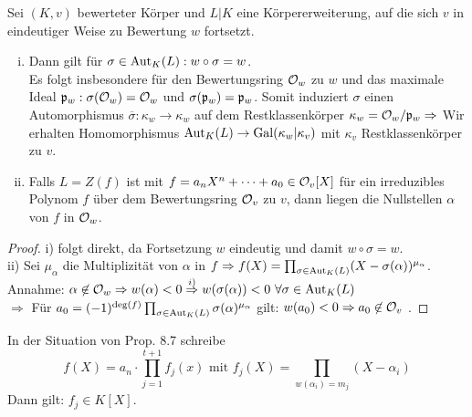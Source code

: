 \begin{Bem}
Sei $(K,v)$ bewerteter Körper und $L|K$ eine Körpererweiterung, auf die sich $v$ in eindeutiger Weise zu Bewertung $w$ fortsetzt.
\begin{enumerate}[i)]
\item Dann gilt für $\sigma \in \operatorname{Aut}_K(L): w \circ \sigma = w$.\\
Es folgt insbesondere für den Bewertungsring $\mathcal{O}_w$ zu $w$ und das maximale Ideal $\mathfrak{p}_w: \sigma(\mathcal{O}_w)=\mathcal{O}_w$ und $\sigma(\mathfrak{p}_w)=\mathfrak{p}_w$. Somit induziert $\sigma$ einen Automorphismus $\overline{\sigma}: \kappa_w \to \kappa_w$ auf dem Restklassenkörper $\kappa_w=\mathcal{O}_w/\mathfrak{p}_w \Rightarrow$ Wir erhalten Homomorphismus $\operatorname{Aut}_K(L) \to \operatorname{Gal}(\kappa_w|\kappa_v)$ mit $\kappa_v$ Restklassenkörper zu $v$.
\item Falls $L=Z(f)$ ist mit $f=a_nX^n+\dots+a_0 \in \mathcal{O}_v[X]$ für ein irreduzibles Polynom $f$ über dem Bewertungsring $\mathcal{O}_v$ zu $v$, dann liegen die Nullstellen $\alpha$ von $f$ in $\mathcal{O}_w$.
\end{enumerate}
\end{Bem}

\begin{proof}
i) folgt direkt, da Fortsetzung $w$ eindeutig und damit $w \circ \sigma = w$.\\
ii) Sei $\mu_\alpha$ die Multiplizität von $\alpha$ in $f \Rightarrow f(X)= \prod_{\sigma \in \operatorname{Aut}_K(L)} (X-\sigma(\alpha))^{\mu_\alpha}$.\\
Annahme: $\alpha \not \in \O_w \Rightarrow w(\alpha)<0 \stackrel{i)}{\Rightarrow} w(\sigma(\alpha))<0 \ \forall \sigma \in \Aut_K(L)$\\
$\Rightarrow$ Für $a_0=(-1)^{\deg(f)} \prod_{\sigma \in \operatorname{Aut}_K(L)} \sigma(\alpha)^{\mu_\alpha}$ gilt: $w(a_0)<0 \Rightarrow a_0 \not \in \mathcal{O}_v$ \Lightning.
\end{proof}

\begin{Prop}
In der Situation von Prop. 8.7 schreibe
\[ f(X)=a_n \cdot \prod_{j=1}^{t+1} f_j(x) \text{ mit } f_j(X)= \prod_{w(\alpha_i)=m_j} (X-\alpha_i)\]
Dann gilt: $f_j \in K[X]$.
\end{Prop}

